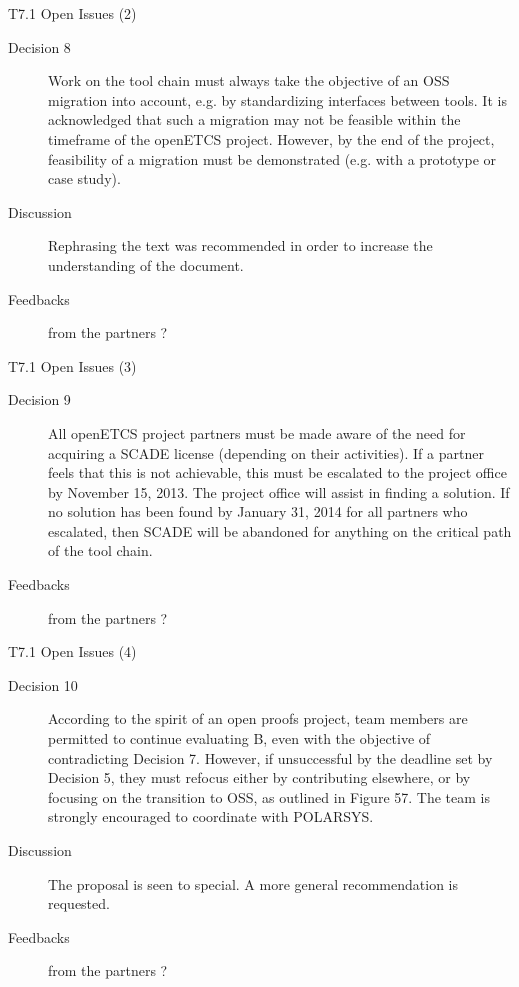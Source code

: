 \begin{frame}{T7.1 Open Issues (2)}

\begin{description}
\item[Decision 8] Work on the tool chain must always take the objective of an OSS migration into account, e.g. by standardizing interfaces between tools. It is acknowledged that such a migration may not be feasible within the timeframe of the openETCS project. However, by the end of the project, feasibility of a migration must be demonstrated (e.g. with a prototype or case study).
\item[Discussion]  Rephrasing the text was recommended in order to increase the understanding of the document.
\item[Feedbacks] from the partners ?
\end{description}

\end{frame}



\begin{frame}{T7.1 Open Issues (3)}

\begin{description}
\item[Decision 9] All openETCS project partners must be made aware of the need for acquiring a SCADE license (depending on their activities). If a partner feels that this is not achievable, this must be escalated to the project office by November 15, 2013. The project office will assist in finding a solution. If no solution has been found by January 31, 2014 for all partners who escalated, then SCADE will be abandoned for anything on the critical path of the tool chain.
\item[Feedbacks] from the partners ?

\end{description}

\end{frame}

\begin{frame}{T7.1 Open Issues (4)}

\begin{description}
\item[Decision 10] According to the spirit of an open proofs project, team members are permitted to continue evaluating B, even with the objective of contradicting Decision 7. However, if unsuccessful by the deadline set by Decision 5, they must refocus either by contributing elsewhere, or by focusing on the transition to OSS, as outlined in Figure 57. The team is strongly encouraged to coordinate with POLARSYS.
\item[Discussion]  The proposal is seen to special. A more general recommendation is requested.
\item[Feedbacks] from the partners ?
\end{description}

\end{frame}


